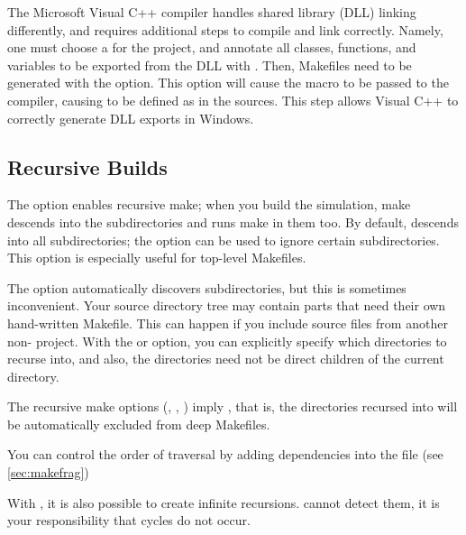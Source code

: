 \ifcommercial
\begin{note}
The Microsoft Visual C++ compiler handles shared library (DLL) linking
differently, and requires additional steps to compile and link correctly.
Namely, one must choose a  for the project, and annotate all classes,
functions, and variables to be exported from the DLL with .
Then, Makefiles need to be generated with the  option.
This option will cause the  macro to be passed to
the compiler, causing  to be defined as  in
the sources. This step allows Visual C++ to correctly generate DLL exports in Windows.
\end{note}


\fi


\subsection{Recursive Builds}
\label{sec:build-sim-progs:recursive-builds}


The  option enables recursive make; when you build the simulation, make
descends into the subdirectories and runs make in them too.
By default,  descends into all subdirectories; the  option
can be used to ignore certain subdirectories. This option is especially useful
for top-level Makefiles.

The  option automatically discovers subdirectories, but this
is sometimes inconvenient. Your source directory tree may contain
parts that need their own hand-written Makefile. This can happen if
you include source files from another non-{\opp} project. With the 
or  option, you can explicitly specify which directories to
recurse into, and also, the directories need not be direct children of the
current directory.

The recursive make options (, , )
imply , that is, the directories recursed into will be
automatically excluded from deep Makefiles.

You can control the order of traversal by adding dependencies into
the  file (see \ref{sec:makefrag})

\begin{note}
With , it is also possible to create infinite recursions.
 cannot detect them, it is your responsibility that
cycles do not occur.
\end{note}


